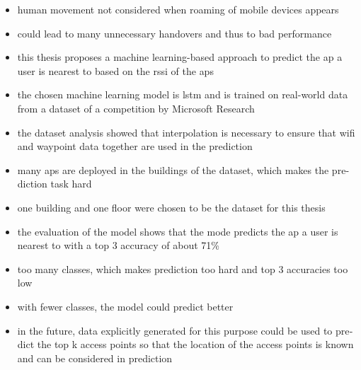 \null\vfil
\begin{otherlanguage}{english}
\begin{center}\textsf{\textbf{\abstractname}}\end{center}

\noindent 
\begin{itemize}
    \item human movement not considered when roaming of mobile devices appears
    \item could lead to many unnecessary handovers and thus to bad performance
    \item this thesis proposes a machine learning-based approach to predict the \ac{ap} a user is nearest to based on the \ac{rssi} of the \acp{ap}
    \item the chosen machine learning model is \ac{lstm} and is trained on real-world data from a dataset of a competition by Microsoft Research
    \item the dataset analysis showed that interpolation is necessary to ensure that \ac{wifi} and waypoint data together are used in the prediction
    \item many \acp{ap} are deployed in the buildings of the dataset, which makes the prediction task hard
    \item one building and one floor were chosen to be the dataset for this thesis
    \item the evaluation of the model shows that the mode predicts the \ac{ap} a user is nearest to with a top 3 accuracy of about 71\%
    \item too many classes, which makes prediction too hard and top 3 accuracies too low
    \item with fewer classes, the model could predict better
    \item in the future, data explicitly generated for this purpose could be used to predict the top k access points so that the location of the access points is known and can be considered in prediction
\end{itemize}

\end{otherlanguage}
\vfil\null
